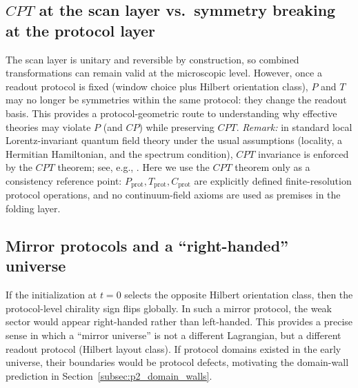 \subsection{\texorpdfstring{$CPT$}{CPT} at the scan layer vs.\ symmetry breaking at the protocol layer}
\label{subsec:cpt_protocol}

The scan layer is unitary and reversible by construction, so combined transformations can remain valid at the microscopic level.
However, once a readout protocol is fixed (window choice plus Hilbert orientation class), $P$ and $T$ may no longer be symmetries within the same protocol: they change the readout basis.
This provides a protocol-geometric route to understanding why effective theories may violate $P$ (and $CP$) while preserving $CPT$.
\emph{Remark:} in standard local Lorentz-invariant quantum field theory under the usual assumptions (locality, a Hermitian Hamiltonian, and the spectrum condition), $CPT$ invariance is enforced by the $CPT$ theorem; see, e.g., \cite{StreaterWightman1989,WeinbergQFT1995}.
Here we use the $CPT$ theorem only as a consistency reference point: $P_{\mathrm{prot}},T_{\mathrm{prot}},C_{\mathrm{prot}}$ are explicitly defined finite-resolution protocol operations, and no continuum-field axioms are used as premises in the folding layer.

\subsection{Mirror protocols and a ``right-handed'' universe}
\label{subsec:mirror_universe}

If the initialization at $t=0$ selects the opposite Hilbert orientation class, then the protocol-level chirality sign flips globally.
In such a mirror protocol, the weak sector would appear right-handed rather than left-handed.
This provides a precise sense in which a ``mirror universe'' is not a different Lagrangian, but a different readout protocol (Hilbert layout class).
If protocol domains existed in the early universe, their boundaries would be protocol defects, motivating the domain-wall prediction in Section~\ref{subsec:p2_domain_walls}.


